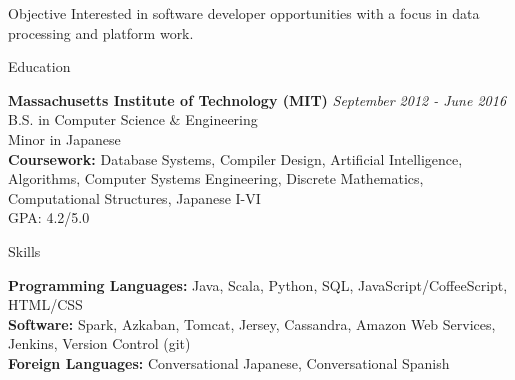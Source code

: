 \documentclass{resume} %
\begin{document}

\begin{rSection}{Objective}
Interested in software developer opportunities with a focus in data processing and platform work.
\end{rSection}


\begin{rSection}{Education}

{\bf Massachusetts Institute of Technology (MIT)} \hfill {\em September 2012 - June 2016} \\ 
B.S. in Computer Science \& Engineering \\
Minor in Japanese \smallskip \\
\textbf{Coursework:} Database Systems, Compiler Design, Artificial Intelligence, Algorithms, Computer Systems Engineering, Discrete Mathematics,
Computational Structures,
Japanese I-VI\\
GPA: 4.2/5.0

\end{rSection}


\begin{rSection}{Skills}

\textbf{Programming Languages:} Java, Scala, Python,  SQL, JavaScript/CoffeeScript, HTML/CSS\\
\textbf{Software:} Spark, Azkaban, Tomcat, Jersey, Cassandra, Amazon Web Services, Jenkins, Version Control (git)\\
\textbf{Foreign Languages:} Conversational Japanese, Conversational Spanish\\

\end{rSection}
\end{document}

